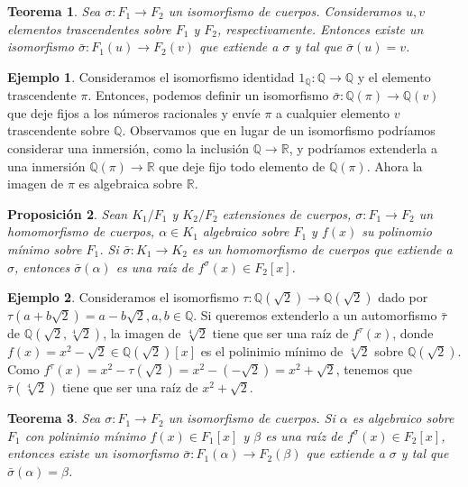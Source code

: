 \documentclass{report}
\newtheorem{theorem}{Teorema}[chapter]
\newtheorem{proposition}[theorem]{Proposición}
\theoremstyle{remark}
\theoremstyle{definition}
\theoremstyle{definition}
\theoremstyle{definition}
\newtheorem*{example}{Ejemplo}
\begin{document}
\begin{theorem}
    Sea $\sigma : F_1 \to F_2$ un isomorfismo de cuerpos.
    Consideramos $u, v$ elementos trascendentes sobre $F_1$ y $F_2$, respectivamente.
    Entonces existe un isomorfismo $\bar{\sigma} : F_1(u) \to F_2(v)$ que extiende a $\sigma$ y tal que $\bar{\sigma}(u) = v$.
\end{theorem}

\begin{example}
    Consideramos el isomorfismo identidad $1_\mathbb{Q} : \mathbb{Q} \to \mathbb{Q}$ y el elemento trascendente $\pi$.
    Entonces, podemos definir un isomorfismo $\bar{\sigma} : \mathbb{Q}(\pi) \to \mathbb{Q}(v)$ que deje fijos a los números racionales y envíe $\pi$ a cualquier elemento $v$ trascendente sobre $\mathbb{Q}$.
    Observamos que en lugar de un isomorfismo podríamos considerar una inmersión, como la inclusión $\mathbb{Q} \to \mathbb{R}$, y podríamos extenderla a una inmersión $\mathbb{Q}(\pi) \to \mathbb{R}$ que deje fijo todo elemento de $\mathbb{Q}(\pi)$.
    Ahora la imagen de $\pi$ es algebraica sobre $\mathbb{R}$.
\end{example}

\begin{proposition}
    Sean $K_1/F_1$ y $K_2/F_2$ extensiones de cuerpos, $\sigma : F_1 \to F_2$ un homomorfismo de cuerpos, $\alpha \in K_1$ algebraico sobre $F_1$ y $f(x)$ su polinomio mínimo sobre $F_1$.
    Si $\bar{\sigma} : K_1 \to K_2$ es un homomorfismo de cuerpos que extiende a $\sigma$, entonces $\bar{\sigma}(\alpha)$ es una raíz de $f^\sigma(x) \in F_2[x]$.
\end{proposition}

\begin{example}
    Consideramos el isomorfismo $\tau : \mathbb{Q}(\sqrt{2}) \to \mathbb{Q}(\sqrt{2})$ dado por $\tau(a + b\sqrt{2}) = a - b\sqrt{2}, a, b \in \mathbb{Q}$.
    Si queremos extenderlo a un automorfismo $\bar{\tau}$ de $\mathbb{Q}(\sqrt{2}, \sqrt[4]{2})$, la imagen de $\sqrt[4]{2}$ tiene que ser una raíz de $f^\tau(x)$, donde $f(x) = x^2 - \sqrt{2} \in \mathbb{Q}(\sqrt{2})[x]$ es el polinimio mínimo de $\sqrt[4]{2}$ sobre $\mathbb{Q}(\sqrt{2})$.
    Como $f^\tau(x) = x^2 - \tau(\sqrt{2}) = x^2 - (-\sqrt{2}) = x^2 + \sqrt{2}$, tenemos que $\bar{\tau}(\sqrt[4]{2})$ tiene que ser una raíz de $x^2 + \sqrt{2}$.
\end{example}

\begin{theorem}
    Sea $\sigma : F_1 \to F_2$ un isomorfismo de cuerpos.
    Si $\alpha$ es algebraico sobre $F_1$ con polinimio mínimo $f(x) \in F_1[x]$ y $\beta$ es una raíz de $f^\sigma(x) \in F_2[x]$, entonces existe un isomorfismo $\bar{\sigma} : F_1(\alpha) \to F_2(\beta)$ que extiende a $\sigma$ y tal que $\bar{\sigma}(\alpha) = \beta$.
\end{theorem}
\end{document}
